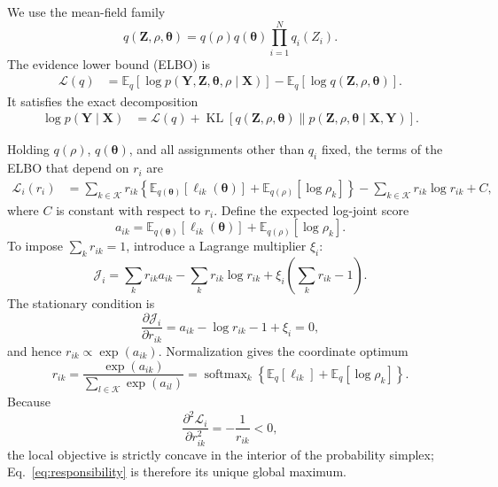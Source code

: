 We use the mean-field family
\begin{equation}
 q(\boldsymbol Z,\rho,\boldsymbol\theta)
 =q(\rho)q(\boldsymbol\theta)\prod_{i=1}^{N}q_i(Z_i).
\label{eq:mean-field-family}
\end{equation}
The evidence lower bound (ELBO) is
\begin{align}
\mathcal L(q)
&=\mathbb E_q\!\left[
  \log p(\boldsymbol Y,\boldsymbol Z,\boldsymbol\theta,\rho
       \mid\boldsymbol X)\right]
  -\mathbb E_q[\log q(\boldsymbol Z,\rho,\boldsymbol\theta)] .
\label{eq:elbo}
\end{align}
It satisfies the exact decomposition
\begin{align}
\log p(\boldsymbol Y\mid\boldsymbol X)
&=\mathcal L(q)
 +\operatorname{KL}\!\left[
 q(\boldsymbol Z,\rho,\boldsymbol\theta)
 \parallel
 p(\boldsymbol Z,\rho,\boldsymbol\theta
   \mid\boldsymbol X,\boldsymbol Y)
 \right].
\end{align}

Holding $q(\rho)$, $q(\boldsymbol\theta)$, and all assignments other than
$q_i$ fixed, the terms of the ELBO that depend on $r_i$ are
\begin{align}
\mathcal L_i(r_i)
&=\sum_{k\in\mathcal K}r_{ik}
  \left\{
  \mathbb E_{q(\boldsymbol\theta)}[\ell_{ik}(\boldsymbol\theta)]
  +\mathbb E_{q(\rho)}[\log\rho_k]
  \right\}
  -\sum_{k\in\mathcal K}r_{ik}\log r_{ik}+C,
\label{eq:local-elbo}
\end{align}
where $C$ is constant with respect to $r_i$. Define the expected log-joint
score
\begin{equation}
 a_{ik}=\mathbb E_{q(\boldsymbol\theta)}
        [\ell_{ik}(\boldsymbol\theta)]
        +\mathbb E_{q(\rho)}[\log\rho_k].
\label{eq:assignment-score}
\end{equation}
To impose $\sum_k r_{ik}=1$, introduce a Lagrange multiplier $\xi_i$:
\begin{equation}
 \mathcal J_i
 =\sum_k r_{ik}a_{ik}-\sum_k r_{ik}\log r_{ik}
  +\xi_i\left(\sum_k r_{ik}-1\right).
\end{equation}
The stationary condition is
\begin{equation}
 \frac{\partial\mathcal J_i}{\partial r_{ik}}
 =a_{ik}-\log r_{ik}-1+\xi_i=0,
\end{equation}
and hence $r_{ik}\propto\exp(a_{ik})$. Normalization gives the coordinate
optimum
\begin{equation}
 \boxed{
 r_{ik}
 =\frac{\exp(a_{ik})}{\sum_{l\in\mathcal K}\exp(a_{il})}
 =\operatorname{softmax}_k\!\left\{
 \mathbb E_q[\ell_{ik}]+\mathbb E_q[\log\rho_k]
 \right\}.}
\label{eq:responsibility}
\end{equation}
Because
\begin{equation}
 \frac{\partial^2\mathcal L_i}{\partial r_{ik}^2}
 =-\frac{1}{r_{ik}}<0,
\end{equation}
the local objective is strictly concave in the interior of the probability
simplex; Eq.~\eqref{eq:responsibility} is therefore its unique global maximum.

